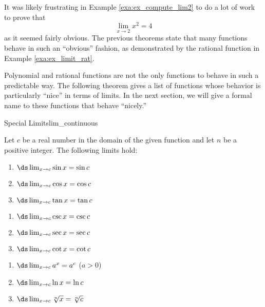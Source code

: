 It was likely frustrating in Example \ref{exa:ex_compute_lim2} to do a lot of work to prove that $$\lim_{x\to 2} x^2 = 4$$ as it seemed fairly obvious. The previous theorems state that many functions behave in such an ``obvious'' fashion, as demonstrated by the rational function in Example \ref{exa:ex_limit_rat}. 

Polynomial and rational functions are not the only functions to behave in such a predictable way. The following theorem gives a list of functions whose behavior is particularly ``nice'' in terms of limits. In the next section, we will give a formal name to these functions that behave ``nicely.''


\begin{theorem}{Special Limits}{lim_continuous}{%
Let $c$ be a real number in the domain of the given function and let $n$ be a positive integer. The following limits hold: 

\noindent\begin{minipage}[t]{.33\textwidth}
\begin{enumerate}
\item		$\ds \lim_{x\to c} \sin x = \sin c$
\item		$\ds \lim_{x\to c} \cos x = \cos c$
\item		$\ds \lim_{x\to c} \tan x = \tan c$
\end{enumerate}
\end{minipage}
\begin{minipage}[t]{.33\textwidth}
\begin{enumerate}\addtocounter{enumi}{3}
\item		$\ds \lim_{x\to c} \csc x = \csc c$
\item		$\ds \lim_{x\to c} \sec x = \sec c$
\item		$\ds \lim_{x\to c} \cot x = \cot c$
\end{enumerate}
\end{minipage}
\begin{minipage}[t]{.33\textwidth}
\begin{enumerate}\addtocounter{enumi}{6}
\item		$\ds \lim_{x\to c} a^x = a^c$ ($a>0$)
\item		$\ds \lim_{x\to c} \ln x = \ln c$
\item		$\ds \lim_{x\to c} \sqrt[n]{x} = \sqrt[n]{c}$\end{enumerate}
\end{minipage}
}
\end{theorem}




